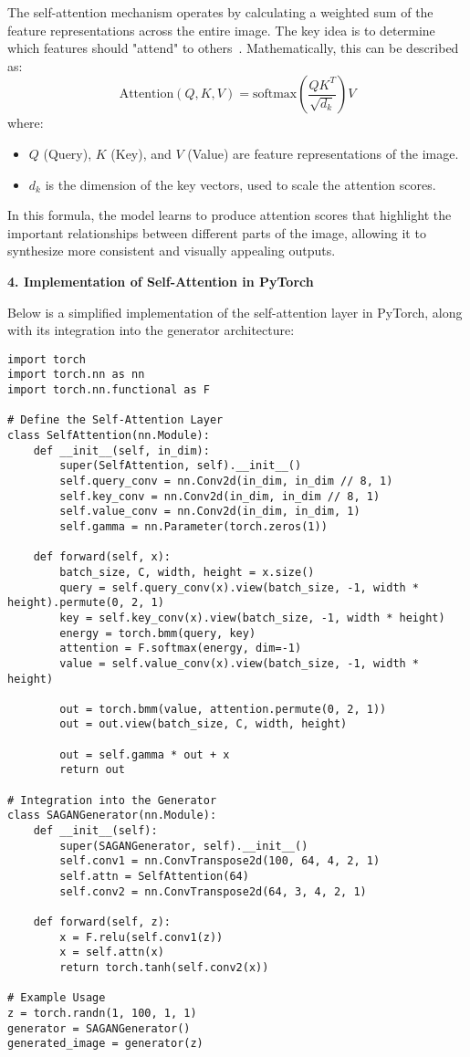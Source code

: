 The self-attention mechanism operates by calculating a weighted sum of the feature representations across the entire image. The key idea is to determine which features should "attend" to others~\cite{vaswani2017attention}. Mathematically, this can be described as:
\[
\text{Attention}(Q, K, V) = \text{softmax}\left(\frac{QK^T}{\sqrt{d_k}}\right) V
\]
where:
\begin{itemize}
    \item $Q$ (Query), $K$ (Key), and $V$ (Value) are feature representations of the image.
    \item $d_k$ is the dimension of the key vectors, used to scale the attention scores.
\end{itemize}

In this formula, the model learns to produce attention scores that highlight the important relationships between different parts of the image, allowing it to synthesize more consistent and visually appealing outputs.

\textbf{4. Implementation of Self-Attention in PyTorch}

Below is a simplified implementation of the self-attention layer in PyTorch, along with its integration into the generator architecture:

\begin{lstlisting}[style=python]
import torch
import torch.nn as nn
import torch.nn.functional as F

# Define the Self-Attention Layer
class SelfAttention(nn.Module):
    def __init__(self, in_dim):
        super(SelfAttention, self).__init__()
        self.query_conv = nn.Conv2d(in_dim, in_dim // 8, 1)
        self.key_conv = nn.Conv2d(in_dim, in_dim // 8, 1)
        self.value_conv = nn.Conv2d(in_dim, in_dim, 1)
        self.gamma = nn.Parameter(torch.zeros(1))
    
    def forward(self, x):
        batch_size, C, width, height = x.size()
        query = self.query_conv(x).view(batch_size, -1, width * height).permute(0, 2, 1)
        key = self.key_conv(x).view(batch_size, -1, width * height)
        energy = torch.bmm(query, key)
        attention = F.softmax(energy, dim=-1)
        value = self.value_conv(x).view(batch_size, -1, width * height)
        
        out = torch.bmm(value, attention.permute(0, 2, 1))
        out = out.view(batch_size, C, width, height)
        
        out = self.gamma * out + x
        return out

# Integration into the Generator
class SAGANGenerator(nn.Module):
    def __init__(self):
        super(SAGANGenerator, self).__init__()
        self.conv1 = nn.ConvTranspose2d(100, 64, 4, 2, 1)
        self.attn = SelfAttention(64)
        self.conv2 = nn.ConvTranspose2d(64, 3, 4, 2, 1)
    
    def forward(self, z):
        x = F.relu(self.conv1(z))
        x = self.attn(x)
        return torch.tanh(self.conv2(x))

# Example Usage
z = torch.randn(1, 100, 1, 1)
generator = SAGANGenerator()
generated_image = generator(z)
\end{lstlisting}


